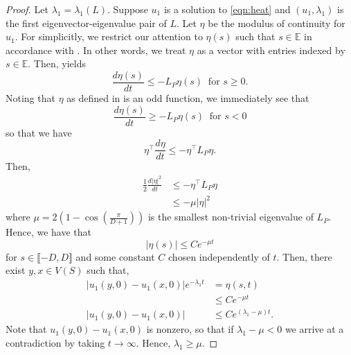 \graphbound*
\begin{proof}
    Let $\lambda_1 = \lambda_1(L)$. Suppose $u_1$ is a solution to \cref{eqn:heat} and $(u_1,\lambda_1)$ is the first eigenvector-eigenvalue pair of $L$. Let $\eta$ be the modulus of continuity for $u_1$. For simplicitly, we restrict our attention to $\eta(s)$ such that $s\in \mathbb{E}$ in accordance with . In other words, we treat $\eta$ as a vector with entries indexed by $s \in \mathbb{E}$. Then,  yields
    \begin{equation*}
        \frac{d\eta(s)}{dt} \leq - L_P  \eta(s) \;\; \text{for $s \geq 0$}.
    \end{equation*}
    Noting that $\eta$ as defined in  is an odd function, we immediately see that
    \begin{equation*}
        \frac{d\eta(s)}{dt} \geq - L_P  \eta(s) \;\; \text{for $s < 0$}
    \end{equation*}
    so that we have
    \begin{equation*}
        \eta^{\top}\frac{d\eta}{dt} \leq - \eta^{\top}L_P  \eta.
    \end{equation*}
    Then,
    \begin{align*}
    		\frac{1}{2}\frac{d \lvert \eta \rvert^2}{dt} &\leq -\eta^{\top} L_P \eta \\
    		&\leq - \mu \lvert \eta \rvert^2
    \end{align*}
    where $\mu= 2\left(1-\cos\left(\frac{\pi}{D+1}\right)\right)$ is the smallest non-trivial eigenvalue of $L_P$. Hence, we have that 
    \begin{equation*}
        \lvert \eta(s) \rvert \leq C e^{-\mu t}
    \end{equation*}
    for $s \in \llbracket -D,D \rrbracket$ and some constant $C$ chosen independently of $t$. Then, there exist $y,x \in V(S)$ such that,
    \begin{align*}
        \lvert u_1(y,0)-u_1(x,0)\rvert e^{-\lambda_1 t} & = \eta(s,t) \\
        &\leq C e^{-\mu t} \\
        \lvert u_1(y,0)-u_1(x,0) \rvert &\leq C e^{(\lambda_1-\mu)t}.
    \end{align*}
    Note that $u_1(y,0)-u_1(x,0)$ is nonzero, so that if $\lambda_1-\mu < 0$ we arrive at a contradiction by taking $t \rightarrow \infty$. Hence, $\lambda_1 \geq \mu$.
\end{proof}

